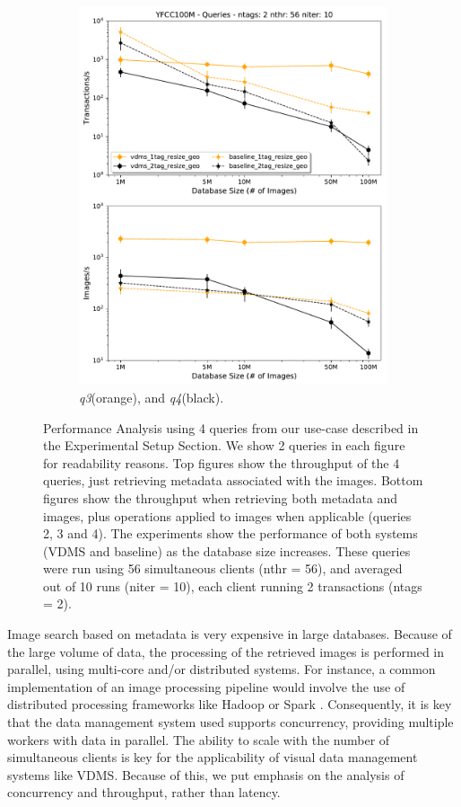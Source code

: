 \begin{figure}[ht!]
\begin{subfigure}{.5\linewidth}
  \includegraphics[width=\columnwidth]{figures/queries_throughput_56_q3_q4}
  \caption{\textit{q3}(orange), and \textit{q4}(black).}
  \label{fig:q3_q4}
\end{subfigure}
\caption{Performance Analysis using 4 queries from our use-case
described in the Experimental Setup Section.
We show 2 queries in each figure for readability reasons.
Top figures show the throughput of the 4 queries,
just retrieving metadata associated with the images.
Bottom figures show the throughput when retrieving both metadata and images,
plus operations applied to images when applicable (queries 2, 3 and 4).
The experiments show the performance of both systems (VDMS and baseline) as the
database size increases.
These queries were run using 56 simultaneous clients (nthr = 56),
and averaged out of 10 runs (niter = 10),
each client running 2 transactions (ntags = 2).}
\label{fig:q_throughput_56}
\end{figure}

Image search based on metadata is very expensive in large databases.
Because of the large volume of data, the processing of the retrieved images
is performed in parallel, using multi-core and/or distributed systems.
For instance, a common implementation of an image processing pipeline
would involve the use of distributed processing frameworks
like Hadoop \cite{hadoop} or Spark \cite{spark}.
Consequently, it is key that the data management system used supports
concurrency, providing multiple workers with data in parallel.
The ability to scale with the number of simultaneous clients is key for the
applicability of visual data management systems like VDMS.
Because of this, we put emphasis on the analysis of concurrency and throughput,
rather than latency.

